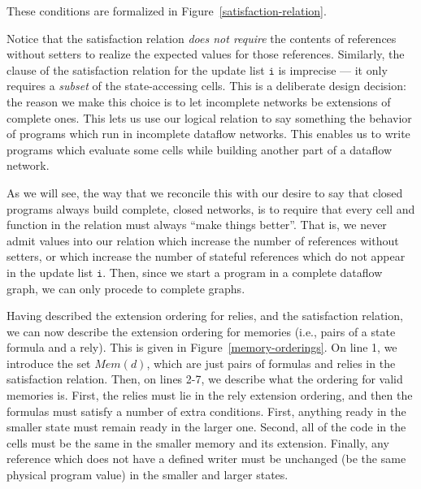 \documentclass[preprint]{sigplanconf}
\newcommand{\term}[1]{\ensuremath{\mathtt{{#1}}}}
\newcommand{\Mem}[1]{\mathit{Mem}(#1)}
\begin{document}
These conditions are formalized in Figure~\ref{satisfaction-relation}. 

Notice that the satisfaction relation \emph{does not require} the
contents of references without setters to realize the expected values
for those references. Similarly, the clause of the satisfaction
relation for the update list \term{i} is imprecise --- it only
requires a \emph{subset} of the state-accessing cells. This is a
deliberate design decision: the reason we make this choice is to let
incomplete networks be extensions of complete ones. This lets us use
our logical relation to say something the behavior of programs which
run in incomplete dataflow networks. This enables us to write programs
which evaluate some cells while building another part of a dataflow
network.

As we will see, the way that we reconcile this with our desire to say
that closed programs always build complete, closed networks, is to
require that every cell and function in the relation must always
``make things better''. That is, we never admit values into our
relation which increase the number of references without setters, or
which increase the number of stateful references which do not appear
in the update list \term{i}. Then, since we start a program in a
complete dataflow graph, we can only procede to complete graphs.

Having described the extension ordering for relies, and the
satisfaction relation, we can now describe the extension ordering for
memories (i.e., pairs of a state formula and a rely). This is given in
Figure~\ref{memory-orderings}. On line 1, we introduce the set
$\Mem{d}$, which are just pairs of formulas and relies in the
satisfaction relation. Then, on lines 2-7, we describe what the
ordering for valid memories is. First, the relies must lie in the rely
extension ordering, and then the formulas must satisfy a number of
extra conditions. First, anything ready in the smaller state must
remain ready in the larger one. Second, all of the code in the cells
must be the same in the smaller memory and its extension.  Finally,
any reference which does not have a defined writer must be unchanged
(be the same physical program value) in the smaller and larger states.
\end{document}
